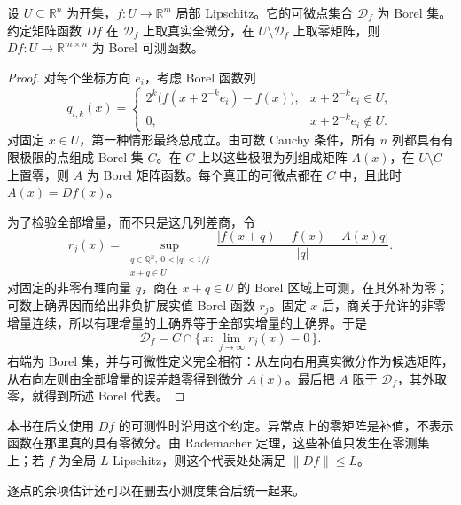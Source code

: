 \begin{proposition}\label{b1:prop:lipschitz-differentiability-borel}
设 \(U\subseteq\mathbb R^n\) 为开集，\(f:U\rightarrow\mathbb R^m\) 局部 Lipschitz。它的可微点集合 \(\mathcal D_f\) 为 Borel 集。约定矩阵函数 \(Df\) 在 \(\mathcal D_f\) 上取真实全微分，在 \(U\setminus\mathcal D_f\) 上取零矩阵，则 \(Df:U\rightarrow\mathbb R^{m\times n}\) 为 Borel 可测函数。
\end{proposition}
\begin{proof}
对每个坐标方向 \(e_i\)，考虑 Borel 函数列
\[
 q_{i,k}(x)=
 \begin{cases}
 2^k\bigl(f(x+2^{-k}e_i)-f(x)\bigr),&x+2^{-k}e_i\in U,\\
 0,&x+2^{-k}e_i\notin U.
 \end{cases}
\]
对固定 \(x\in U\)，第一种情形最终总成立。由可数 Cauchy 条件，所有 \(n\) 列都具有有限极限的点组成 Borel 集 \(C\)。在 \(C\) 上以这些极限为列组成矩阵 \(A(x)\)，在 \(U\setminus C\) 上置零，则 \(A\) 为 Borel 矩阵函数。每个真正的可微点都在 \(C\) 中，且此时 \(A(x)=Df(x)\)。

为了检验全部增量，而不只是这几列差商，令
\[
 r_j(x)=
 \sup_{\substack{q\in\mathbb Q^n,\ 0<|q|<1/j\\x+q\in U}}
       \frac{|f(x+q)-f(x)-A(x)q|}{|q|}.
\]
对固定的非零有理向量 \(q\)，商在 \(x+q\in U\) 的 Borel 区域上可测，在其外补为零；可数上确界因而给出非负扩展实值 Borel 函数 \(r_j\)。固定 \(x\) 后，商关于允许的非零增量连续，所以有理增量的上确界等于全部实增量的上确界。于是
\[
 \mathcal D_f=C\cap\{\,x:\lim_{j\to\infty}r_j(x)=0\,\}.
\]
右端为 Borel 集，并与可微性定义完全相符：从左向右用真实微分作为候选矩阵，从右向左则由全部增量的误差趋零得到微分 \(A(x)\)。最后把 \(A\) 限于 \(\mathcal D_f\)，其外取零，就得到所述 Borel 代表。
\end{proof}

本书在后文使用 \(Df\) 的可测性时沿用这个约定。异常点上的零矩阵是补值，不表示函数在那里真的具有零微分。由 Rademacher 定理，这些补值只发生在零测集上；若 \(f\) 为全局 \(L\)-Lipschitz，则这个代表处处满足 \(\|Df\|\leq L\)。

\ProseParagraphBreak

逐点的余项估计还可以在删去小测度集合后统一起来。

